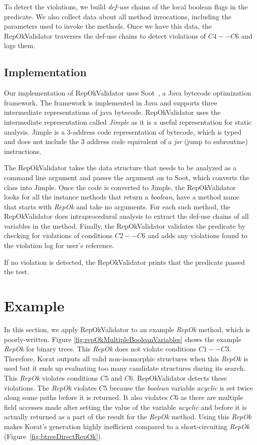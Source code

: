 \para To detect the violations, we build \emph{def-use} chains of the
local boolean flags in the predicate. We also collect data about all
method invocations, including the parameters used to invoke the
methods. Once we have this data, the RepOkValidator traverses the
def-use chains to detect violations of $C4--C6$ and logs them.

\subsection{Implementation}
\label{sec:implementation}
Our implementation of RepOkValidator uses Soot~\cite{vallee1999soot},
a Java bytecode optimization framework. The framework is implemented
in Java and supports three intermediate representations of java
bytecode. RepOkValidator uses the intermediate representation called
\emph{Jimple} as it is a useful representation for static analysis.
Jimple is a 3-address code representation of bytecode, which is typed
and does not include the 3 address code equivalent of a \emph{jsr}
(jump to subroutine) instructions.

\para The RepOkValidator takes the data structure that needs to be
analyzed as a command line argument and passes the argument on to
Soot, which converts the class into Jimple. Once the code is converted
to Jimple, the RepOkValidator looks for all the instance methods that
return a \emph{boolean}, have a method name that starts with
\emph{RepOk} and take no arguments. For each such method, the
RepOkValidator does intraprocedural analysis to extract the def-use
chains of all variables in the method. Finally, the RepOkValidator
validates the predicate by checking for violations of conditions
$C2--C6$ and adds any violations found to the violation log for user’s
reference.

\para If no violation is detected, the RepOkValidator prints that the
predicate passed the test.

\section{Example}
\label{sec:static-analysis-example}
In this section, we apply RepOkValidator to an example \emph{RepOk} method,
which is poorly-written.  Figure
\ref{fig:repOkMultipleBooleanVariables} shows the example \emph{RepOk}
for binary trees.  This \emph{RepOk} does not violate conditions
$C1--C3$.  Therefore, Korat outputs all valid non-isomorphic
structures when this \emph{RepOk} is used but it ends up evaluating
too many candidate structures during its search.  This \emph{RepOk} violates
conditions $C5$ and $C6$.  RepOkValidator detects these violations.
The \emph{RepOk} violates $C5$ because the \emph{boolean} variable
\emph{acyclic} is set twice along some paths before it is returned.
It also violates $C6$ as there are multiple field accesses made after
setting the value of the variable \emph{acyclic} and before it is
actually returned as a part of the result for the \emph{RepOk} method.
Using this \emph{RepOk} makes Korat's generation highly inefficient compared
to a short-circuiting \emph{RepOk} (Figure~\ref{fig:btreeDirectRepOk}).


